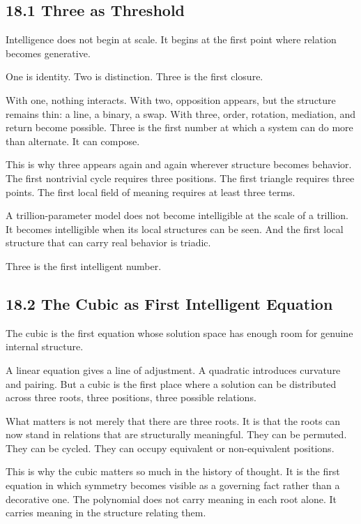 \hypertarget{three-as-threshold}{%
\subsection{18.1 Three as Threshold}\label{three-as-threshold}}

Intelligence does not begin at scale. It begins at the first point where
relation becomes generative.

One is identity. Two is distinction. Three is the first closure.

With one, nothing interacts. With two, opposition appears, but the
structure remains thin: a line, a binary, a swap. With three, order,
rotation, mediation, and return become possible. Three is the first
number at which a system can do more than alternate. It can compose.

This is why three appears again and again wherever structure becomes
behavior. The first nontrivial cycle requires three positions. The first
triangle requires three points. The first local field of meaning
requires at least three terms.

A trillion-parameter model does not become intelligible at the scale of
a trillion. It becomes intelligible when its local structures can be
seen. And the first local structure that can carry real behavior is
triadic.

Three is the first intelligent number.

\hypertarget{the-cubic-as-first-intelligent-equation}{%
\subsection{18.2 The Cubic as First Intelligent
Equation}\label{the-cubic-as-first-intelligent-equation}}

The cubic is the first equation whose solution space has enough room for
genuine internal structure.

A linear equation gives a line of adjustment. A quadratic introduces
curvature and pairing. But a cubic is the first place where a solution
can be distributed across three roots, three positions, three possible
relations.

What matters is not merely that there are three roots. It is that the
roots can now stand in relations that are structurally meaningful. They
can be permuted. They can be cycled. They can occupy equivalent or
non-equivalent positions.

This is why the cubic matters so much in the history of thought. It is
the first equation in which symmetry becomes visible as a governing fact
rather than a decorative one. The polynomial does not carry meaning in
each root alone. It carries meaning in the structure relating them.

